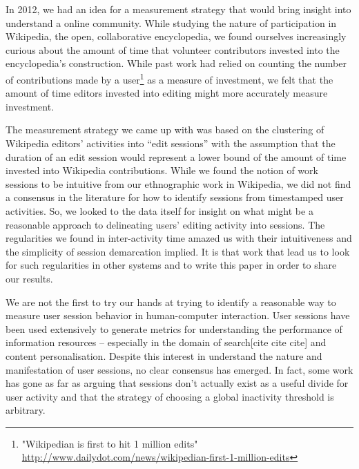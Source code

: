 In 2012, we had an idea for a measurement strategy that would bring insight into understand a online community.  While studying the nature of participation in Wikipedia, the open, collaborative encyclopedia, we found ourselves increasingly curious about the amount of time that volunteer contributors invested into the encyclopedia's construction.  While past work had relied on counting the number of contributions made by a user\footnote{"Wikipedian is first to hit 1 million edits" \url{http://www.dailydot.com/news/wikipedian-first-1-million-edits}} as a measure of investment, we felt that the amount of time editors invested into editing might more accurately measure investment.

The measurement strategy we came up with was based on the clustering of Wikipedia editors' activities into ``edit sessions'' with the assumption that the duration of an edit session would represent a lower bound of the amount of time invested into Wikipedia contributions\cite{geiger13using}.  While we found the notion of work sessions to be intuitive from our ethnographic work in Wikipedia, we did not find a consensus in the literature for how to identify sessions from timestamped user activities.  So, we looked to the data itself for insight on what might be a reasonable approach to delineating users' editing activity into sessions. The regularities we found in inter-activity time amazed us with their intuitiveness and the simplicity of session demarcation implied. It is that work that lead us to look for such regularities in other systems and to write this paper in order to share our results.

We are not the first to try our hands at trying to identify a reasonable way to measure user session behavior in human-computer interaction.  User sessions have been used extensively to generate metrics for understanding the performance of information resources\cite{govseva2006empirical} -- especially in the domain of search[cite cite cite] and content personalisation\cite{spiliopoulou2003framework,gomory1999analysis}. Despite this interest in understand the nature and manifestation of user sessions, no clear consensus has emerged.  In fact, some work has gone as far as arguing that sessions don't actually exist as a useful divide for user activity\cite{jones2008beyond} and that the strategy of choosing a global inactivity threshold is arbitrary\cite{montgomery2001identifying}.

